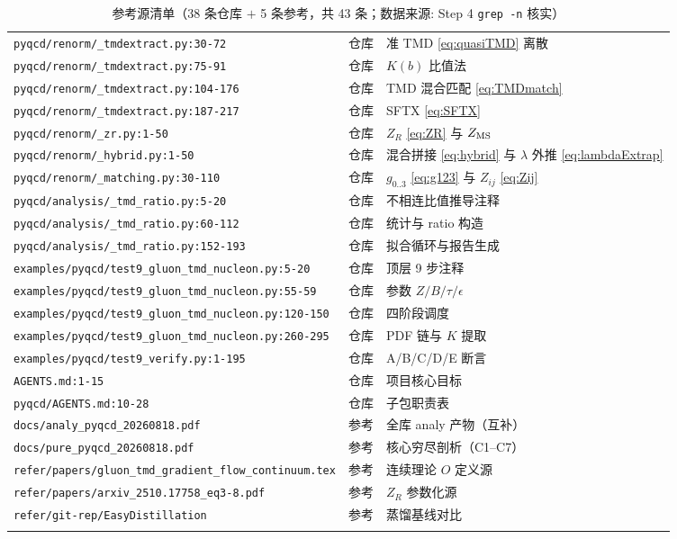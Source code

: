 \documentclass[UTF8]{ctexart}
\begin{document}
\begin{xltabular}{\textwidth}{llX}
\texttt{\nolinkurl{pyqcd/renorm/\_tmdextract.py:30-72}} & 仓库 & 准 TMD \eqref{eq:quasiTMD} 离散 \\
\texttt{\nolinkurl{pyqcd/renorm/\_tmdextract.py:75-91}} & 仓库 & $K(b)$ 比值法 \\
\texttt{\nolinkurl{pyqcd/renorm/\_tmdextract.py:104-176}} & 仓库 & TMD 混合匹配 \eqref{eq:TMDmatch} \\
\texttt{\nolinkurl{pyqcd/renorm/\_tmdextract.py:187-217}} & 仓库 & SFTX \eqref{eq:SFTX} \\
\texttt{\nolinkurl{pyqcd/renorm/\_zr.py:1-50}} & 仓库 & $Z_R$ \eqref{eq:ZR} 与 $Z_{\rm MS}$ \\
\texttt{\nolinkurl{pyqcd/renorm/\_hybrid.py:1-50}} & 仓库 & 混合拼接 \eqref{eq:hybrid} 与 $\lambda$ 外推 \eqref{eq:lambdaExtrap} \\
\texttt{\nolinkurl{pyqcd/renorm/\_matching.py:30-110}} & 仓库 & $g_{0..3}$ \eqref{eq:g123} 与 $Z_{ij}$ \eqref{eq:Zij} \\
\texttt{\nolinkurl{pyqcd/analysis/\_tmd\_ratio.py:5-20}} & 仓库 & 不相连比值推导注释 \\
\texttt{\nolinkurl{pyqcd/analysis/\_tmd\_ratio.py:60-112}} & 仓库 & 统计与 ratio 构造 \\
\texttt{\nolinkurl{pyqcd/analysis/\_tmd\_ratio.py:152-193}} & 仓库 & 拟合循环与报告生成 \\
\texttt{\nolinkurl{examples/pyqcd/test9\_gluon\_tmd\_nucleon.py:5-20}} & 仓库 & 顶层 9 步注释 \\
\texttt{\nolinkurl{examples/pyqcd/test9\_gluon\_tmd\_nucleon.py:55-59}} & 仓库 & 参数 $Z/B/\tau/\epsilon$ \\
\texttt{\nolinkurl{examples/pyqcd/test9\_gluon\_tmd\_nucleon.py:120-150}} & 仓库 & 四阶段调度 \\
\texttt{\nolinkurl{examples/pyqcd/test9\_gluon\_tmd\_nucleon.py:260-295}} & 仓库 & PDF 链与 $K$ 提取 \\
\texttt{\nolinkurl{examples/pyqcd/test9\_verify.py:1-195}} & 仓库 & A/B/C/D/E 断言 \\
\texttt{\nolinkurl{AGENTS.md:1-15}} & 仓库 & 项目核心目标 \\
\texttt{\nolinkurl{pyqcd/AGENTS.md:10-28}} & 仓库 & 子包职责表 \\
\texttt{\nolinkurl{docs/analy\_pyqcd\_20260818.pdf}} & 参考 & 全库 analy 产物（互补）\\
\texttt{\nolinkurl{docs/pure\_pyqcd\_20260818.pdf}} & 参考 & 核心穷尽剖析（C1--C7）\\
\texttt{\nolinkurl{refer/papers/gluon\_tmd\_gradient\_flow\_continuum.tex}} & 参考 & 连续理论 $O$ 定义源 \\
\texttt{\nolinkurl{refer/papers/arxiv\_2510.17758\_eq3-8.pdf}} & 参考 & $Z_R$ 参数化源 \\
\texttt{\nolinkurl{refer/git-rep/EasyDistillation}} & 参考 & 蒸馏基线对比 \\
\bottomrule
\caption{参考源清单（38 条仓库 $+$ 5 条参考，共 43 条；数据来源: Step 4 \texttt{\nolinkurl{grep -n}} 核实）}
\end{xltabular}
\end{document}

